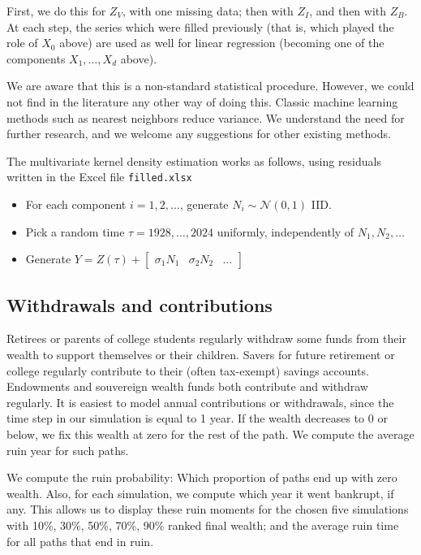 \documentclass[12pt]{amsart}
\begin{document}
First, we do this for $Z_V$, with one missing data; then with $Z_I$, and then with $Z_B$. At each step, the series which were filled previously (that is, which played the role of $X_0$ above) are used as well for linear regression (becoming one of the components $X_1, \ldots, X_d$ above). 

We are aware that this is a non-standard statistical procedure. However, we could not find in the literature any other way of doing this. Classic machine learning methods such as nearest neighbors reduce variance. We understand the need for further research, and we welcome any suggestions for other existing methods. 

The multivariate kernel density estimation works as follows, using residuals written in the Excel file \texttt{filled.xlsx} 
\begin{itemize}
\item For each component $i = 1, 2, \ldots$, generate $N_i \sim \mathcal N(0, 1)$ IID.
\item Pick a random time $\tau = 1928, \ldots, 2024$ uniformly, independently of $N_1, N_2, \ldots$
\item Generate $Y = Z(\tau) + \begin{bmatrix}\sigma_1N_1 & \sigma_2N_2 & \ldots \end{bmatrix}$
\end{itemize}

\subsection{Withdrawals and contributions} Retirees or parents of college students regularly withdraw some funds from their wealth to support themselves or their children. Savers for future retirement or college regularly contribute to their (often tax-exempt) savings accounts. Endowments and souvereign wealth funds both contribute and withdraw regularly. It is easiest to model annual contributions or withdrawals, since the time step in our simulation is equal to 1 year.  If the wealth decreases to 0 or below, we fix this wealth at zero for the rest of the path. We compute the average ruin year for such paths. 

We compute the ruin probability: Which proportion of paths end up with zero wealth. Also, for each simulation, we compute which year it went bankrupt, if any. This allows us to display these ruin moments for the chosen five simulations with 10\%, 30\%, 50\%, 70\%, 90\% ranked final wealth; and the average ruin time for all paths that end in ruin. 
\end{document}
